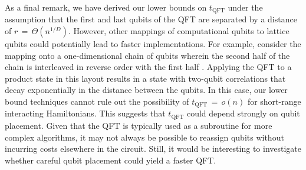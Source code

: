 As a final remark, we have derived our lower bounds on $t_\textrm{QFT}$ under the assumption that the first and last qubits of the QFT are separated by a distance of $r$\,$=$\,$\Theta(n^{1/D})$.
However, other mappings of computational qubits to lattice qubits could potentially lead to faster implementations.
For example, consider the mapping onto a one-dimensional chain of qubits wherein the second half of the chain is interleaved in reverse order with the first half \cite{note_interleaving}.
Applying the QFT to a product state in this layout results in a state with two-qubit correlations that decay exponentially in the distance between the qubits.
In this case, our lower bound techniques cannot rule out the possibility of $t_\textrm{QFT}$\,$=$\,$o(n)$ for short-range interacting Hamiltonians.
This suggests that $t_\textrm{QFT}$ could depend strongly on qubit placement.
Given that the QFT is typically used as a subroutine for more complex algorithms, it may not always be possible to reassign qubits without incurring costs elsewhere in the circuit.
Still, it would be interesting to investigate whether careful qubit placement could yield a faster QFT.
